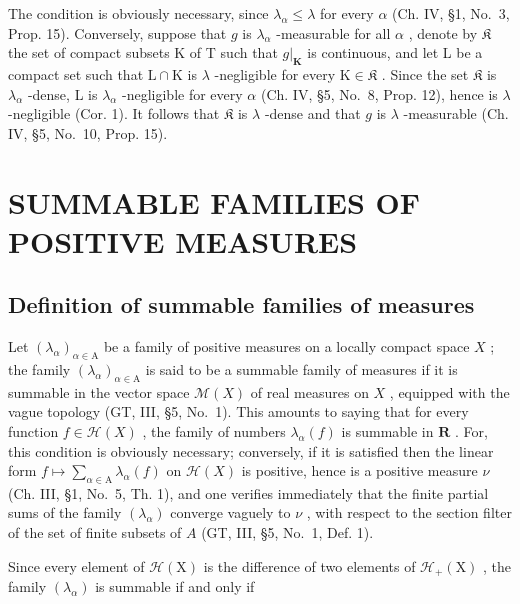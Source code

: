 The condition is obviously necessary, since \(\lambda_{\alpha} \leqslant \lambda\) for every \(\alpha\) (Ch. IV, §1, No.~3, Prop. 15). Conversely, suppose that \(g\) is \(\lambda_{\alpha}\) -measurable for all \(\alpha\) , denote by \(\mathfrak{K}\) the set of compact subsets K of T such that \(g|_{\mathbf{K}}\) is continuous, and let L be a compact set such that \(\mathrm{L} \cap \mathrm{K}\) is \(\lambda\) -negligible for every \(\mathrm{K} \in \mathfrak{K}\) . Since the set \(\mathfrak{K}\) is \(\lambda_{\alpha}\) -dense, L is \(\lambda_{\alpha}\) -negligible for every \(\alpha\) (Ch. IV, §5, No.~8, Prop. 12), hence is \(\lambda\) -negligible (Cor. 1). It follows that \(\mathfrak{K}\) is \(\lambda\) -dense and that \(g\) is \(\lambda\) -measurable (Ch. IV, §5, No.~10, Prop. 15).

\section{SUMMABLE FAMILIES OF POSITIVE MEASURES}

\subsection{Definition of summable families of measures}

Let \((\lambda_{\alpha})_{\alpha \in \mathrm{A}}\) be a family of positive measures on a locally compact space \(X\) ; the family \((\lambda_{\alpha})_{\alpha \in \mathrm{A}}\) is said to be a summable family of measures if it is summable in the vector space \(\mathcal{M}(X)\) of real measures on \(X\) , equipped with the vague topology (GT, III, §5, No.~1). This amounts to saying that for every function \(f \in \mathcal{H}(X)\) , the family of numbers \(\lambda_{\alpha}(f)\) is summable in \(\mathbf{R}\) . For, this condition is obviously necessary; conversely, if it is satisfied then the linear form \(f \mapsto \sum_{\alpha \in \mathrm{A}} \lambda_{\alpha}(f)\) on \(\mathcal{H}(X)\) is positive, hence is a positive measure \(\nu\) (Ch. III, §1, No.~5, Th. 1), and one verifies immediately that the finite partial sums of the family \((\lambda_{\alpha})\) converge vaguely to \(\nu\) , with respect to the section filter of the set of finite subsets of \(A\) (GT, III, §5, No.~1, Def. 1).

Since every element of \(\mathcal{H}(\mathrm{X})\) is the difference of two elements of \(\mathcal{H}_{+}(\mathrm{X})\) , the family \((\lambda_{\alpha})\) is summable if and only if

